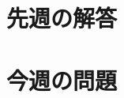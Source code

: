 \documentclass[a4paper,12pt]{jarticle}
\begin{document}
\solmode
\section{先週の解答}




\probmode
\section{今週の問題}


\end{document}
